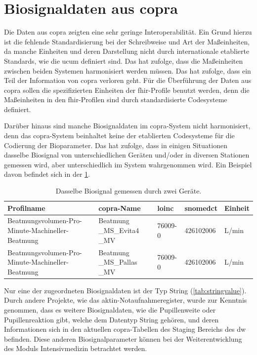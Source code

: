 \section{Biosignaldaten aus \acs{copra}} \label{sec:configvarcopradiscu}

Die Daten aus \ac{copra} zeigten eine sehr geringe Interoperabilität. Ein Grund hierzu ist die fehlende Standardisierung bei der Schreibweise und Art der Maßeinheiten, da manche Einheiten und deren Darstellung nicht durch internationale etablierte Standards, wie die \ac{ucum} definiert sind. Das hat zufolge, dass die Maßeinheiten zwischen beiden Systemen harmonisiert werden müssen. Das hat zufolge, dass ein Teil der Information von \ac{copra} verloren geht. Für die Überführung der Daten aus \ac{copra} sollen die spezifizierten Einheiten der \ac{fhir}-Profile benutzt werden, denn die Maßeinheiten in den \ac{fhir}-Profilen sind durch standardisierte Codesysteme definiert.

Darüber hinaus sind manche Biosignaldaten im \ac{copra}-System nicht harmonisiert, denn das \ac{copra}-System beinhaltet keine der etablierten Codesysteme für die Codierung der Bioparameter. Das hat zufolge, dass in einigen Situationen dasselbe Biosignal von unterschiedlichen Geräten und/oder in diversen Stationen gemessen wird, aber unterschiedlich im System wahrgenommen wird. Ein Beispiel davon befindet sich in der \ref{tab:sameprofilbiosig}.

\clearpage

 \begin{table}[ht]
 	\centering 
 	\caption[Dasselbe Biosignal gemessen durch zwei Geräte]{Dasselbe Biosignal gemessen durch zwei Geräte.}
 	\label{tab:sameprofilbiosig}
 	\begin{tabular}{|p{3.5cm}|p{2.4cm}|l|l|l|}
 		\hline
 		 \bfseries Profilname & \bfseries \ac{copra}-Name & \bfseries \acs{loinc} & \bfseries \ac{snomedct} & \bfseries Einheit \\ \hline
 		Beatmungsvolumen-Pro-Minute-Machineller-Beatmung & Beatmung \_MS\_Evita4 \_MV & 76009-0 & 426102006 & L/min \\ \hline
 		Beatmungsvolumen-Pro-Minute-Machineller-Beatmung & Beatmung \_MS\_Pallas \_MV & 76009-0 & 426102006 & L/min \\ \hline
 	\end{tabular}
 \end{table}

Nur eine der zugeordneten Biosignaldaten ist der Typ String (\ref{tab:stringvalue}). Durch andere Projekte, wie das \ac{aktin}-Notaufnahmeregister, wurde zur Kenntnis genommen, dass es weitere Biosignaldaten, wie die Pupillenweite oder Pupillenreaktion gibt, welche dem Datentyp String gehören, und deren Informationen sich in den aktuellen \ac{copra}-Tabellen des Staging Bereichs des \ac{dw} befinden. Diese anderen Biosignalparameter können bei der Weiterentwicklung des Moduls \glqq Intensivmedizin\grqq{} betrachtet werden.

